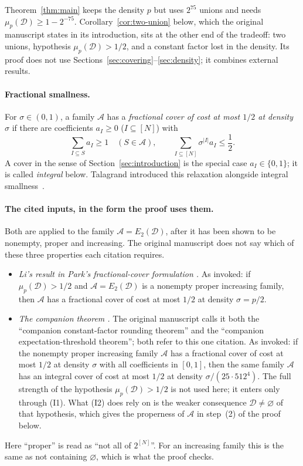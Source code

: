 \documentclass[11pt,letterpaper]{article}
\theoremstyle{definition}
\theoremstyle{remark}
\numberwithin{equation}{section}
\begin{document}
Theorem~\ref{thm:main} keeps the density $p$ but uses $2^{75}$ unions and
needs $\mu_p(\mathcal D)\ge1-2^{-75}$.
Corollary~\ref{cor:two-union} below, which the original manuscript states
in its introduction, sits at the other end of the tradeoff: two unions,
hypothesis $\mu_p(\mathcal D)>1/2$, and a constant factor lost in the
density. Its proof does not use
Sections~\ref{sec:covering}--\ref{sec:density}; it combines external
results.

\paragraph{Fractional smallness.}
For $\sigma\in(0,1)$, a family $\mathcal A$ has a \emph{fractional cover
of cost at most $1/2$ at density $\sigma$} if there are coefficients
$a_I\ge0$ ($I\subseteq[N]$) with
\[
\sum_{I\subseteq S}a_I\ge1\quad(S\in\mathcal A),
\qquad
\sum_{I\subseteq[N]}\sigma^{|I|}a_I\le\frac12.
\]
A cover in the sense of Section~\ref{sec:introduction} is the special case
$a_I\in\{0,1\}$; it is called \emph{integral} below. Talagrand introduced
this relaxation alongside integral
smallness~\cite[Sections~6 and~7]{Talagrand10}.

\paragraph{The cited inputs, in the form the proof uses them.}
Both are applied to the family $\mathcal A=E_2(\mathcal D)$, after it has
been shown to be nonempty, proper and increasing. The original manuscript
does not say which of these three properties each citation requires.
\begin{itemize}
\item[(I1)] \emph{Li's result \cite[Corollary~3.1]{Li26} in Park's
fractional-cover formulation \cite[Theorem~3.4]{Park26}.} As invoked: if
$\mu_p(\mathcal D)>1/2$ and $\mathcal A=E_2(\mathcal D)$ is a nonempty
proper increasing family, then $\mathcal A$ has a fractional cover of cost
at most $1/2$ at density $\sigma=p/2$.
\item[(I2)] \emph{The companion theorem
\cite[Theorem~1.1]{OpenAIThreshold26}.} The original manuscript calls it
both the ``companion constant-factor rounding theorem'' and the
``companion expectation-threshold theorem''; both refer to this one
citation. As invoked: if the nonempty proper increasing family
$\mathcal A$ has a fractional cover of cost at most $1/2$ at density
$\sigma$ with all coefficients in $[0,1]$, then the same family
$\mathcal A$ has an integral cover of cost at most $1/2$ at density
$\sigma/(25\cdot512^4)$. The full strength of the hypothesis
$\mu_p(\mathcal D)>1/2$ is not used here; it enters only through (I1).
What (I2) does rely on is the weaker consequence
$\mathcal D\ne\varnothing$ of that hypothesis, which gives the properness
of $\mathcal A$ in step~(2) of the proof below.
\end{itemize}
Here ``proper'' is read as ``not all of $2^{[N]}$''. For an increasing
family this is the same as not containing $\varnothing$, which is what the
proof checks.
\end{document}
